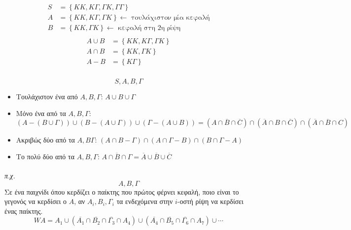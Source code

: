 \documentclass[11pt,a4paper,titlepage,draft]{article}
\begin{document}
\subsubsection{}
\begin{align*}
S &=  \left\lbrace KK, K\Gamma, \Gamma K, \Gamma \Gamma \right\rbrace \\
A &=  \left\lbrace KK, K \Gamma, \Gamma K  \right\rbrace \leftarrow \text{ τουλάχιστον μία κεφαλή} \\
B &= \left\lbrace KK, \Gamma K  \right\rbrace \leftarrow \text{ κεφαλή στη 2η ρίψη} \\
\end{align*}
\begin{align*}
A\cup B &=  \left\lbrace KK, K \Gamma , \Gamma K  \right\rbrace \\
A\cap B &=  \left\lbrace KK,  \Gamma K  \right\rbrace \\
A-B &=  \left\lbrace K \Gamma  \right\rbrace
\end{align*}

\subsubsection{}
\[S,A,B, \Gamma \]
\begin{itemize}
\item Τουλάχιστον ένα από \(A,B, \Gamma \): \(A \cup B \cup  \Gamma \)
\item Μόνο ένα από τα \(Α,Β, \Gamma \): \(
\left( A - \left( B \cup \Gamma \right) \right) \cup
\left( B - \left( A \cup \Gamma \right) \right) \cup
\left( \Gamma  - \left( A \cup B \right) \right) =
\left( A \cap \overline{B} \cap \overline{C} \right) \cap
\left( \overline{A} \cap B \cap \overline{C} \right) \cap
\left( \overline{A} \cap \overline{B} \cap C \right)
\)
\item Ακριβώς δύο από τα \(A,B \Gamma \):
\(
\left(A \cap B - \Gamma \right) \cap
\left(A \cap \Gamma  - B \right) \cap
\left(B \cap  \Gamma - A \right)
\)
\item Το πολύ δύο από τα \(A,B, \Gamma\):
\(
\overline{A \cap B \cap \Gamma } = \overline{A} \cup \overline{B} \cup \overline{C}
\)
\end{itemize}

\paragraph{}
\textit{π.χ.}
\[A,B, \Gamma \]
Σε ένα παιχνίδι όπου κερδίζει ο παίκτης που πρώτος φέρνει κεφαλή, ποιο είναι το γεγονός να κερδίσει ο \(A\), αν \(A_i, B_i, \Gamma_i\) τα ενδεχόμενα στην \(i\)-οστή ρίψη να κερδίσει ένας παίκτης.
\[
WA = A_1 \cup \left( \overline{A_1} \cap \overline{B_2} \cap \overline{\Gamma_3} \cap A_4 \right) \cup \left( \overline{A_4} \cap \overline{B_5} \cap \overline{\Gamma_6} \cap A_7 \right) \cup \cdots
\]
\end{document}
